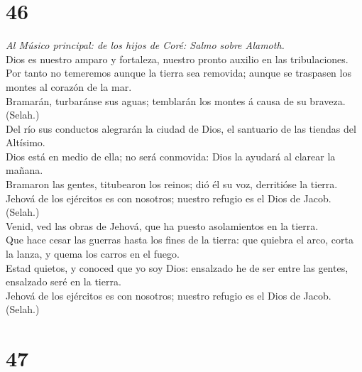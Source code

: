 \hypertarget{section-45}{%
\section{46}\label{section-45}}

 \emph{Al Músico principal: de los hijos de Coré: Salmo
sobre Alamoth.}\\
Dios es nuestro amparo y fortaleza, nuestro pronto auxilio en las
tribulaciones.\\
 Por tanto no temeremos aunque la tierra sea removida;
aunque se traspasen los montes al corazón de la mar.\\
 Bramarán, turbaránse sus aguas; temblarán los montes á
causa de su braveza. (Selah.)\\
 Del río sus conductos alegrarán la ciudad de Dios, el
santuario de las tiendas del Altísimo.\\
 Dios está en medio de ella; no será conmovida: Dios la
ayudará al clarear la mañana.\\
 Bramaron las gentes, titubearon los reinos; dió él su voz,
derritióse la tierra.\\
 Jehová de los ejércitos es con nosotros; nuestro refugio es
el Dios de Jacob. (Selah.)\\
 Venid, ved las obras de Jehová, que ha puesto asolamientos
en la tierra.\\
 Que hace cesar las guerras hasta los fines de la tierra:
que quiebra el arco, corta la lanza, y quema los carros en el fuego.\\
 Estad quietos, y conoced que yo soy Dios: ensalzado he de
ser entre las gentes, ensalzado seré en la tierra.\\
 Jehová de los ejércitos es con nosotros; nuestro refugio
es el Dios de Jacob. (Selah.)

\hypertarget{section-46}{%
\section{47}\label{section-46}}

